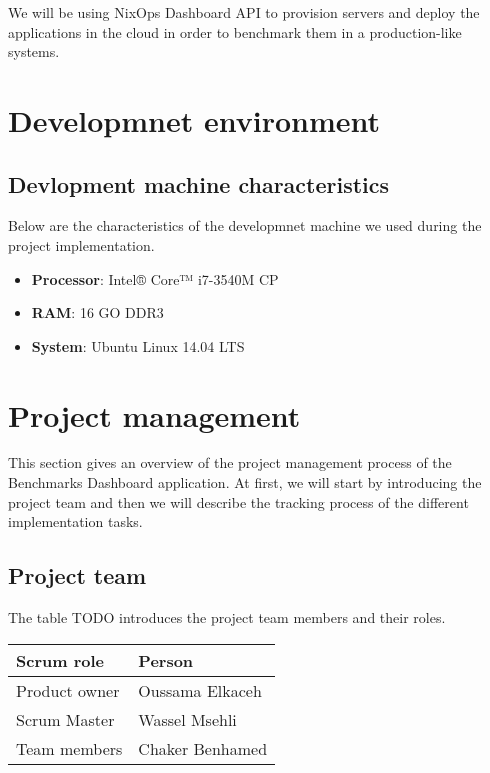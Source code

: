 We will be using NixOps Dashboard API to provision servers and deploy the
applications in the cloud in order to benchmark them in a production-like
systems.

\section{Developmnet environment}
\subsection{Devlopment machine characteristics}
Below are the characteristics of the developmnet machine we used during the
project implementation.

\begin{itemize}
  \item{\textbf{Processor}: Intel® Core™ i7-3540M CP}
  \item{\textbf{RAM}: 16 GO DDR3 }
  \item{\textbf{System}: Ubuntu Linux 14.04 LTS}
\end{itemize}


\section{Project management}
This section gives an overview of the project management process of the
Benchmarks Dashboard application. At first, we will start by introducing the
project team and then we will describe the tracking process of the different
implementation tasks.
\subsection{Project team}
The table TODO introduces the project team members and their roles.

\begin{center}
  \begin{tabular}{ | p{3cm}  | p{6cm} |}
    \hline

    Scrum role    & Person          \\ \hline

    Product owner & Oussama Elkaceh \\ \hline
    Scrum Master  & Wassel Msehli   \\ \hline
    Team members  & Chaker Benhamed \\ \hline

    \hline
  \end{tabular}
\end{center}

